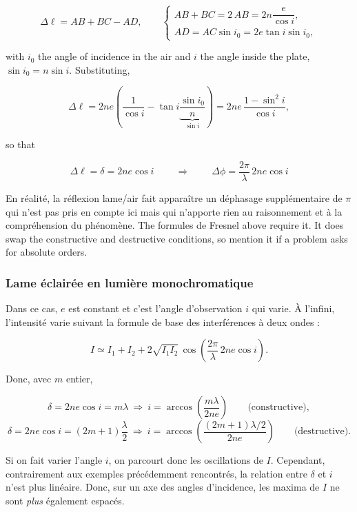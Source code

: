 \[ \Delta\ell = AB + BC - AD, \qquad
   \begin{cases}
     AB + BC = 2\,AB = 2n\dfrac{e}{\cos i}, \\[6pt]
     AD = AC \sin i_0 = 2 e \tan i \sin i_0,
   \end{cases} \]

with $i_0$ the angle of incidence in the air and $i$ the angle inside the plate,
$\sin i_0 = n \sin i$. Substituting,

\[ \Delta\ell = 2ne\left(\frac{1}{\cos i}
   - \tan i \underbrace{\frac{\sin i_0}{n}}_{\sin i}\right)
   = 2ne\,\frac{1 - \sin^{2} i}{\cos i}, \]

so that

\[ \boxed{\ \Delta\ell = \delta = 2ne\cos i \ }
   \qquad\Longrightarrow\qquad
   \boxed{\ \Delta\phi = \frac{2\pi}{\lambda}\,2ne\cos i \ } \]

\begin{remark}
  En réalité, la réflexion lame/air fait apparaître un déphasage supplémentaire
  de $\pi$ qui n'est pas pris en compte ici mais qui n'apporte rien au
  raisonnement et à la compréhension du phénomène. The formules de Fresnel above
  require it. It does swap the constructive and destructive conditions, so
  mention it if a problem asks for absolute orders.
\end{remark}

\subsubsection{Lame éclairée en lumière monochromatique}

Dans ce cas, $e$ est constant et c'est l'angle d'observation $i$ qui varie. À
l'infini, l'intensité varie suivant la formule de base des interférences à deux
ondes :

\[ I \simeq I_1 + I_2 + 2\sqrt{I_1 I_2}\,
   \cos\!\left(\frac{2\pi}{\lambda}\,2ne\cos i\right). \]

Donc, avec $m$ entier,

\[ \delta = 2ne\cos i = m\lambda
   \ \Longrightarrow\ i = \arccos\!\left(\frac{m\lambda}{2ne}\right)
   \qquad \text{(constructive)}, \]
\[ \delta = 2ne\cos i = (2m+1)\frac{\lambda}{2}
   \ \Longrightarrow\ i = \arccos\!\left(\frac{(2m+1)\lambda/2}{2ne}\right)
   \qquad \text{(destructive)}. \]

\begin{remark}
  Si on fait varier l'angle $i$, on parcourt donc les oscillations de $I$.
  Cependant, contrairement aux exemples précédemment rencontrés, la relation
  entre $\delta$ et $i$ n'est plus linéaire. Donc, sur un axe des angles
  d'incidence, les maxima de $I$ ne sont \emph{plus} également espacés.
\end{remark}

